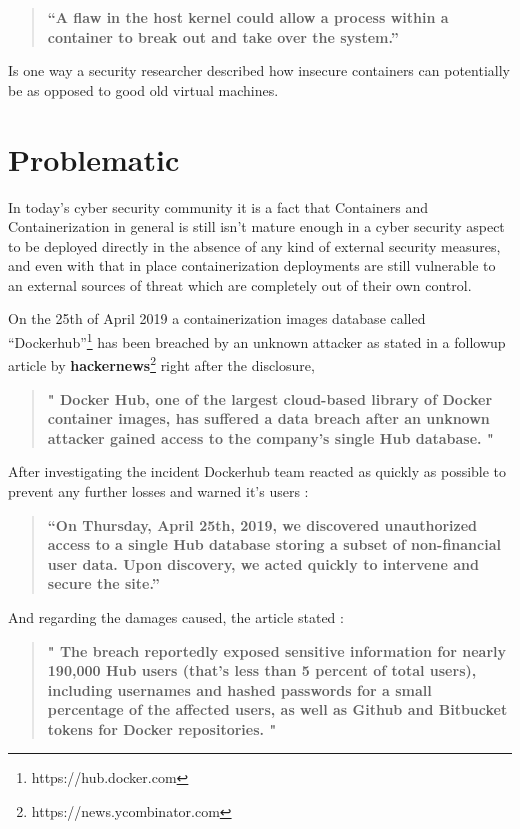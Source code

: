 \documentclass[
  14pt,
  english,
  a4paper,
]{scrreprt}
\begin{document}
\begin{quote}
\textbf{``A flaw in the host kernel could allow a process within a
container to break out and take over the system.''}
\end{quote}

Is one way a security researcher described how insecure containers can
potentially be as opposed to good old virtual machines.

\hypertarget{problematic}{%
\section{Problematic}\label{problematic}}

In today's cyber security community it is a fact that Containers and
Containerization in general is still isn't mature enough in a cyber
security aspect to be deployed directly in the absence of any kind of
external security measures, and even with that in place containerization
deployments are still vulnerable to an external sources of threat which
are completely out of their own control.

On the 25th of April 2019 a containerization images database called
``Dockerhub''\footnote{https://hub.docker.com} has been breached by an
unknown attacker as stated in a followup article by
\textbf{hackernews}\footnote{https://news.ycombinator.com} right after
the disclosure,

\begin{quote}
\textbf{" Docker Hub, one of the largest cloud-based library of Docker
container images, has suffered a data breach after an unknown attacker
gained access to the company's single Hub database. "}
\end{quote}

After investigating the incident Dockerhub team reacted as quickly as
possible to prevent any further losses and warned it's users :

\begin{quote}
\textbf{``On Thursday, April 25th, 2019, we discovered unauthorized
access to a single Hub database storing a subset of non-financial user
data. Upon discovery, we acted quickly to intervene and secure the
site.''}
\end{quote}

And regarding the damages caused, the article stated :

\begin{quote}
\textbf{" The breach reportedly exposed sensitive information for nearly
190,000 Hub users (that's less than 5 percent of total users), including
usernames and hashed passwords for a small percentage of the affected
users, as well as Github and Bitbucket tokens for Docker repositories.
"}
\end{quote}
\end{document}
